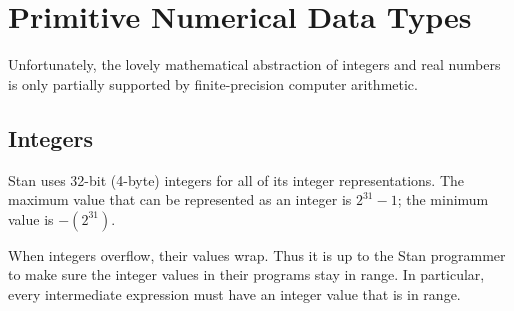 


\section{Primitive Numerical Data Types}\label{numerical-data-types.section}

Unfortunately, the lovely mathematical abstraction of integers and
real numbers is only partially supported by finite-precision computer
arithmetic.

\subsection{Integers}

Stan uses 32-bit (4-byte) integers for all of its integer
representations.  The maximum value that can be represented
as an integer is $2^{31}-1$; the minimum value is $-(2^{31})$.

When integers overflow, their values wrap.  Thus it is up to the Stan
programmer to make sure the integer values in their programs stay in
range.  In particular, every intermediate expression must have an
integer value that is in range.

